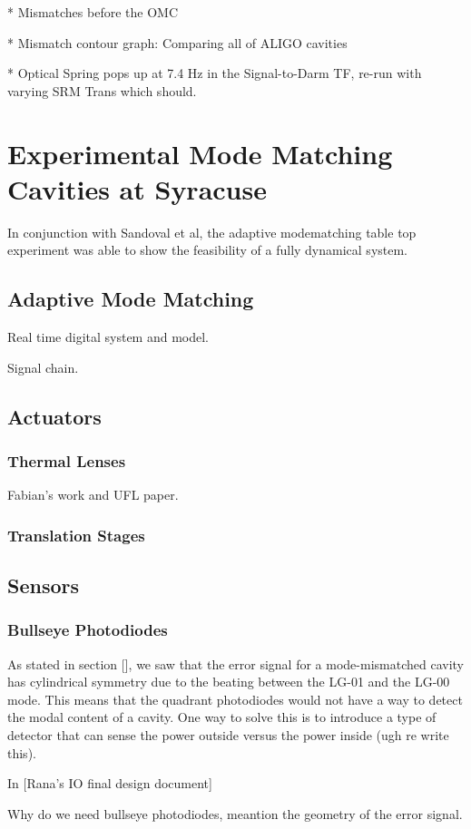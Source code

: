 \documentclass[oneside]{book}
\begin{document}
		* Mismatches before the OMC
			
		* Mismatch contour graph: Comparing all of ALIGO cavities
		
		* Optical Spring pops up at 7.4 Hz in the Signal-to-Darm TF, re-run with varying SRM Trans which should.

\chapter{Experimental Mode Matching Cavities at Syracuse}
In conjunction with Sandoval et al, the adaptive modematching table top experiment was able to show the feasibility of a fully dynamical system.
	\section{Adaptive Mode Matching}
	Real time digital system and model.
	
	Signal chain.
	
	\section{Actuators}
		\subsection{Thermal Lenses}
		Fabian's work and UFL paper.
		\subsection{Translation Stages}
		
	\section{Sensors}
		\subsection{Bullseye Photodiodes}
		As stated in section [], we saw that the error signal for a mode-mismatched cavity has cylindrical symmetry due to the beating between the LG-01 and the LG-00 mode.  This means that the quadrant photodiodes would not have a way to detect the modal content of a cavity.  One way to solve this is to introduce a type of detector that can sense the power outside versus the power inside (ugh re write this).
		
		In [Rana's IO final design document] 
		
		
		Why do we need bullseye photodiodes, meantion the geometry of the error signal.
		
\end{document}
